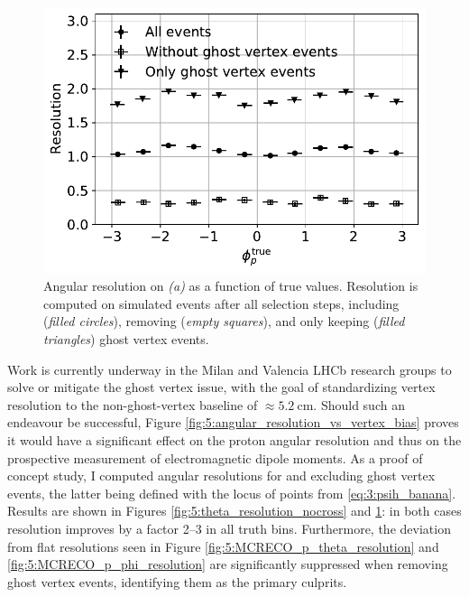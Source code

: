 \begin{figure}[t]
	\centering
	\includegraphics[width=.7\textwidth]{graphics/05-angular_distributions/MCRECO_p_phi_resolution_nocross.pdf}
	\caption{Angular resolution on \phip \textit{(a)} as a function of true values. Resolution is computed on simulated \demonstratorshort events after all selection steps, including (\textit{filled circles}), removing (\textit{empty squares}), and only keeping (\textit{filled triangles}) \lambdadecay ghost vertex events.}
	\label{fig:5:phi_resolution_nocross}
\end{figure}

Work is currently underway in the Milan and Valencia LHCb research groups to solve or mitigate the ghost vertex issue, with the goal of standardizing \lz vertex resolution to the non-ghost-vertex baseline of $\approx \SI{5.2}{\centi\meter}$.
Should such an endeavour be successful, Figure \ref{fig:5:angular_resolution_vs_vertex_bias} proves it would have a significant effect on the proton angular resolution and thus on the prospective measurement of \lz electromagnetic dipole moments.
As a proof of concept study, I computed angular resolutions for \cthetap and \phip excluding ghost vertex events, the latter being defined with the locus of points from \eqref{eq:3:psih_banana}.
Results are shown in Figures \ref{fig:5:theta_resolution_nocross} and \ref{fig:5:phi_resolution_nocross}:
in both cases resolution improves by a factor 2--3 in all truth bins.
Furthermore, the deviation from flat resolutions seen in Figure \ref{fig:5:MCRECO_p_theta_resolution} and \ref{fig:5:MCRECO_p_phi_resolution} are significantly suppressed when removing ghost vertex events, identifying them as the primary culprits.

